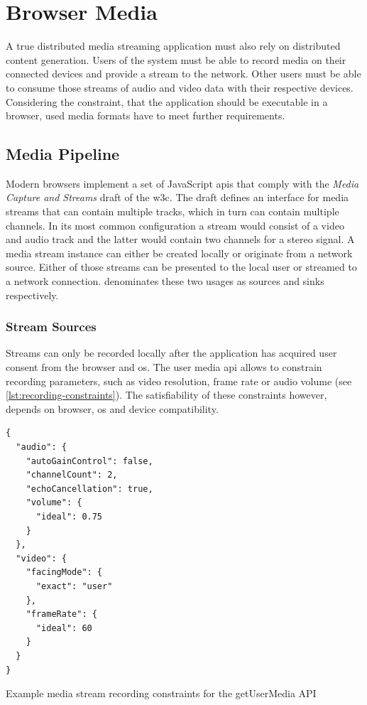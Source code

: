 \section{Browser Media}

A true distributed media streaming application must also rely on distributed content generation. Users of the system must be able to record media on their connected devices and provide a stream to the network. Other users must be able to consume those streams of audio and video data with their respective devices. Considering the constraint, that the application should be executable in a browser, used media formats have to meet further requirements.

\subsection{Media Pipeline}
\label{browser-api}

Modern browsers implement a set of JavaScript \glspl{api} that comply with the {\textit{Media Capture and Streams}} draft \citep{media-capture-and-streams} of the \gls{w3c}. The draft defines an interface for media streams that can contain multiple tracks, which in turn can contain multiple channels. In its most common configuration a stream would consist of a video and audio track and the latter would contain two channels for a stereo signal. A media stream instance can either be created locally or originate from a network source. Either of those streams can be presented to the local user or streamed to a network connection. \citet{media-capture-and-streams} denominates these two usages as sources and sinks respectively.

\subsubsection{Stream Sources}

Streams can only be recorded locally after the application has acquired user consent from the browser and \gls{os}. The user media \gls{api} \cite{TODO} allows to constrain recording parameters, such as video resolution, frame rate or audio volume (see \ref{lst:recording-constraints}). The satisfiability of these constraints however, depends on browser, \gls{os} and device compatibility.

\begin{Listing}
\begin{lstlisting}
{
  "audio": {
    "autoGainControl": false,
    "channelCount": 2,
    "echoCancellation": true,
    "volume": {
      "ideal": 0.75
    }
  },
  "video": {
    "facingMode": {
      "exact": "user"
    },
    "frameRate": {
      "ideal": 60
    }
  }
}
\end{lstlisting}
\caption{Example media stream recording constraints for the getUserMedia API}
\label{lst:recording-constraints}
\end{Listing}

